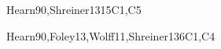 \begin{syllabus}
\begin{unit}{\GVGeometricModeling}{}{Hearn90,Shreiner13}{15}{C1,C5}
   \begin{topics} 
        \item \GVGeometricModelingTopicBasicGeometric
        \item \GVGeometricModelingTopicVolumes
        \item \GVGeometricModelingTopicParametric
        \item \GVGeometricModelingTopicImplicit
        \item \GVGeometricModelingTopicApproximation
        \item \GVGeometricModelingTopicSurface
        \item \GVGeometricModelingTopicSpatial
        \item \GVGeometricModelingTopicProcedural
        \item \GVGeometricModelingTopicElastically
        \item \GVGeometricModelingTopicSubdivision
        \item \GVGeometricModelingTopicMultiresolution
        \item \GVGeometricModelingTopicReconstruction
        \item \GVGeometricModelingTopicConstructive
   \end{topics}

   \begin{learningoutcomes} 
		\item \GVGeometricModelingLORepresent [\Usage]
        \item \GVGeometricModelingLOCreateSimple [\Usage]
        \item \GVGeometricModelingLOGenerateA [\Usage]
        \item \GVGeometricModelingLOGenerateAData [\Usage]
        \item \GVGeometricModelingLOConstructCsg [\Usage]
        \item \GVGeometricModelingLOContrastModeling [\Assessment]
   \end{learningoutcomes}
\end{unit}

\begin{unit}{\GVAdvancedRendering}{}{Hearn90,Foley13,Wolff11,Shreiner13}{6}{C1,C4}
   \begin{topics} 
        \item \GVAdvancedRenderingTopicTime
        \item \GVAdvancedRenderingTopicShadow
        \item \GVAdvancedRenderingTopicOcclusion
        \item \GVAdvancedRenderingTopicSubsurface
        \item \GVAdvancedRenderingTopicNon
        \item \GVAdvancedRenderingTopicGpu
        \item \GVAdvancedRenderingTopicHuman
   \end{topics}


\end{unit}
\end{syllabus}
